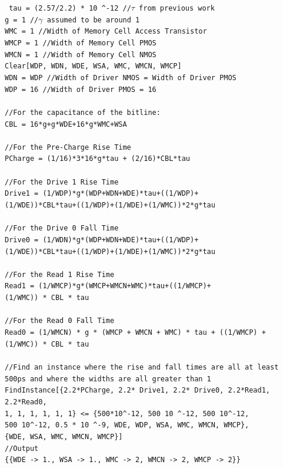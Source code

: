 \documentclass[a4paper]{article}
\def\code#1{\texttt{#1}}
\newcommand\tab[1][1cm]{\hspace*{#1}}
\begin{document}
\code {
tau = (2.57/2.2) * 10 \textasciicircum -12 \textnormal{//$\tau$ from previous work}\\
g = 1 \textnormal{//$\gamma$ assumed to be around 1}\\
WMC = 1 \textnormal{//Width of Memory Cell Access Transistor}\\
WMCP = 1 \textnormal{//Width of Memory Cell PMOS}\\
WMCN = 1 \textnormal{//Width of Memory Cell NMOS}\\
Clear[WDP, WDN, WDE, WSA, WMC, WMCN, WMCP]\\
WDN = WDP \textnormal{//Width of Driver NMOS = Width of Driver PMOS}\\
WDP = 16 \textnormal{//Width of Driver PMOS = 16}\\
\\
\textnormal{//For the capacitance of the bitline:}\\
CBL = 16*g+g*WDE+16*g*WMC+WSA\\
\\
\textnormal{//For the Pre-Charge Rise Time}\\
PCharge = (1/16)*3*16*g*tau + (2/16)*CBL*tau\\
\\
\textnormal{//For the Drive 1 Rise Time}\\
Drive1 = (1/WDP)*g*(WDP+WDN+WDE)*tau+((1/WDP)+\\
\tab (1/WDE))*CBL*tau+((1/WDP)+(1/WDE)+(1/WMC))*2*g*tau\\
\\
\textnormal{//For the Drive 0 Fall Time}\\
Drive0 = (1/WDN)*g*(WDP+WDN+WDE)*tau+((1/WDP)+\\
\tab (1/WDE))*CBL*tau+((1/WDP)+(1/WDE)+(1/WMC))*2*g*tau\\
\\
\textnormal{//For the Read 1 Rise Time}\\
Read1 = (1/WMCP)*g*(WMCP+WMCN+WMC)*tau+((1/WMCP)+\\
\tab (1/WMC)) * CBL * tau\\
\\
\textnormal{//For the Read 0 Fall Time}\\
Read0 = (1/WMCN) * g * (WMCP + WMCN  + WMC) * tau + ((1/WMCP) +\\
\tab (1/WMC)) * CBL * tau\\
\\
\textnormal{//Find an instance where the rise and fall times are all at least 500ps and where the widths are all greater than 1}\\
FindInstance[\{2.2*PCharge, 2.2* Drive1, 2.2* Drive0, 2.2*Read1, 2.2*Read0,\\
\tab 1, 1, 1, 1, 1, 1\} <= \{500*10\textasciicircum -12, 500 10 \textasciicircum -12, 500 10\textasciicircum -12,\\
\tab 500 10\textasciicircum -12, 0.5 * 10 \textasciicircum -9, WDE, WDP, WSA, WMC, WMCN, WMCP\},\\
\tab \{WDE, WSA, WMC, WMCN, WMCP\}]\\
\textnormal{//Output}\\
\{\{WDE -> 1., WSA -> 1., WMC -> 2, WMCN -> 2, WMCP -> 2\}\}
}
\end{document}
